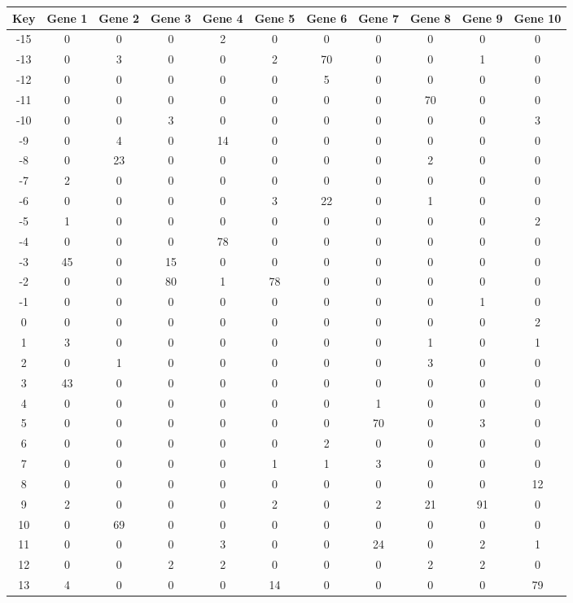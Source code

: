 \begin{tabular}{|c|c|c|c|c|c|c|c|c|c|c|}
\hline
Key & Gene 1 & Gene 2 & Gene 3 & Gene 4 & Gene 5 & Gene 6 & Gene 7 & Gene 8 & Gene 9 & Gene 10 \\
\hline
-15 & 0 & 0 & 0 & 2 & 0 & 0 & 0 & 0 & 0 & 0 \\
-13 & 0 & 3 & 0 & 0 & 2 & 70 & 0 & 0 & 1 & 0 \\
-12 & 0 & 0 & 0 & 0 & 0 & 5 & 0 & 0 & 0 & 0 \\
-11 & 0 & 0 & 0 & 0 & 0 & 0 & 0 & 70 & 0 & 0 \\
-10 & 0 & 0 & 3 & 0 & 0 & 0 & 0 & 0 & 0 & 3 \\
-9 & 0 & 4 & 0 & 14 & 0 & 0 & 0 & 0 & 0 & 0 \\
-8 & 0 & 23 & 0 & 0 & 0 & 0 & 0 & 2 & 0 & 0 \\
-7 & 2 & 0 & 0 & 0 & 0 & 0 & 0 & 0 & 0 & 0 \\
-6 & 0 & 0 & 0 & 0 & 3 & 22 & 0 & 1 & 0 & 0 \\
-5 & 1 & 0 & 0 & 0 & 0 & 0 & 0 & 0 & 0 & 2 \\
-4 & 0 & 0 & 0 & 78 & 0 & 0 & 0 & 0 & 0 & 0 \\
-3 & 45 & 0 & 15 & 0 & 0 & 0 & 0 & 0 & 0 & 0 \\
-2 & 0 & 0 & 80 & 1 & 78 & 0 & 0 & 0 & 0 & 0 \\
-1 & 0 & 0 & 0 & 0 & 0 & 0 & 0 & 0 & 1 & 0 \\
0 & 0 & 0 & 0 & 0 & 0 & 0 & 0 & 0 & 0 & 2 \\
1 & 3 & 0 & 0 & 0 & 0 & 0 & 0 & 1 & 0 & 1 \\
2 & 0 & 1 & 0 & 0 & 0 & 0 & 0 & 3 & 0 & 0 \\
3 & 43 & 0 & 0 & 0 & 0 & 0 & 0 & 0 & 0 & 0 \\
4 & 0 & 0 & 0 & 0 & 0 & 0 & 1 & 0 & 0 & 0 \\
5 & 0 & 0 & 0 & 0 & 0 & 0 & 70 & 0 & 3 & 0 \\
6 & 0 & 0 & 0 & 0 & 0 & 2 & 0 & 0 & 0 & 0 \\
7 & 0 & 0 & 0 & 0 & 1 & 1 & 3 & 0 & 0 & 0 \\
8 & 0 & 0 & 0 & 0 & 0 & 0 & 0 & 0 & 0 & 12 \\
9 & 2 & 0 & 0 & 0 & 2 & 0 & 2 & 21 & 91 & 0 \\
10 & 0 & 69 & 0 & 0 & 0 & 0 & 0 & 0 & 0 & 0 \\
11 & 0 & 0 & 0 & 3 & 0 & 0 & 24 & 0 & 2 & 1 \\
12 & 0 & 0 & 2 & 2 & 0 & 0 & 0 & 2 & 2 & 0 \\
13 & 4 & 0 & 0 & 0 & 14 & 0 & 0 & 0 & 0 & 79 \\
\hline
\end{tabular}